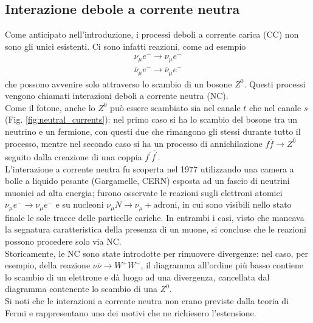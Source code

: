 \documentclass{subnucbo}
\begin{document}
\subsection{Interazione debole a corrente neutra}
\label{subsec:nc}
Come anticipato nell'introduzione, i processi deboli a corrente carica (CC) non sono gli unici esistenti. Ci sono infatti reazioni, come ad esempio
\begin{equation}
        \begin{array} { c } { \nu _ { \mu } e ^ { - } \rightarrow \nu _ { \mu } e ^ { - } } \\ { \overline { \nu } _ { \mu } e ^ { - } \rightarrow \overline { \nu } _ { \mu } e ^ { - } } \end{array}
        \label{eq:neutral_current}
\end{equation}
che possono avvenire solo attraverso lo scambio di un bosone $Z^{0}$. Questi processi vengono chiamati interazioni deboli a corrente neutra (NC). \\
Come il fotone, anche lo $Z^{0}$ può essere scambiato sia nel canale $t$ che nel canale $s$ (Fig. \ref{fig:neutral_currents}): nel primo caso si ha lo scambio del bosone tra un neutrino e un fermione, con questi due che rimangono gli stessi durante tutto il processo, mentre nel secondo caso si ha un processo di annichilazione $f \overline { f } \rightarrow Z ^ { 0 }$ seguito dalla creazione di una coppia $f ^ { \prime } \overline { f ^ { \prime } }$. \\
L'interazione a corrente neutra fu scoperta nel 1977 utilizzando una camera a bolle a liquido pesante (Gargamelle, CERN) esposta ad un fascio di neutrini muonici ad alta energia; furono osservate le reazioni sugli elettroni atomici $\nu _ { \mu } e ^ { - } \rightarrow \nu _ { \mu } e ^ { - }$ e su nucleoni $\nu _ { \mu } N \rightarrow \nu _ { \mu } + \text {adroni}$, in cui sono visibili nello stato finale le sole tracce delle particelle cariche. In entrambi i casi, visto che mancava la segnatura caratteristica della presenza di un muone, si concluse che le reazioni possono procedere solo via NC. \\
Storicamente, le NC sono state introdotte per rimuovere divergenze: nel caso, per esempio, della reazione $\nu \overline { \nu } \rightarrow W ^ { + } W ^ { - }$, il diagramma all'ordine più basso contiene lo scambio di un elettrone e dà luogo ad una divergenza, cancellata dal diagramma contenente lo scambio di una $Z^{0}$. \\
Si noti che le interazioni a corrente neutra non erano previste dalla teoria di Fermi e rappresentano uno dei motivi che ne richiesero l'estensione.
\end{document}
